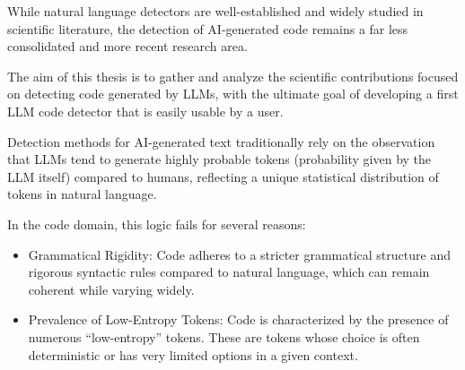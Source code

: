 While natural language detectors are well-established and widely 
studied in scientific literature, the detection of AI-generated code 
remains a far less consolidated and more recent research area. 

The aim of this thesis is to gather and analyze the scientific contributions 
focused on detecting code generated by LLMs, with the ultimate goal of developing 
a first LLM code detector that is easily usable by a user.

Detection methods for AI-generated text traditionally rely 
on the observation that LLMs tend to generate highly probable 
tokens (probability given by the LLM itself) compared to humans, 
reflecting a unique statistical distribution of tokens in natural 
language.

In the code domain, this logic fails for several reasons:
\begin{itemize}
    \item Grammatical Rigidity: Code adheres to a stricter 
    grammatical structure and rigorous syntactic rules compared to natural language, 
    which can remain coherent while varying widely.
    \item Prevalence of Low-Entropy Tokens: Code is characterized by the 
    presence of numerous “low-entropy” tokens. These are tokens whose choice 
    is often deterministic or has very limited options in a given context.
\end{itemize}






